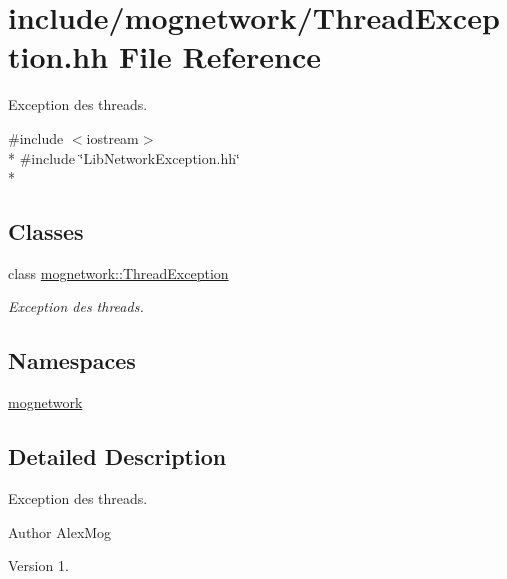 \hypertarget{_thread_exception_8hh}{\section{include/mognetwork/\-Thread\-Exception.hh File Reference}
\label{_thread_exception_8hh}
}


Exception des threads.  


{\ttfamily \#include $<$iostream$>$}\\*
{\ttfamily \#include \char`\"{}Lib\-Network\-Exception.\-hh\char`\"{}}\\*
\subsection*{Classes}
\begin{DoxyCompactItemize}
\item 
class \hyperlink{classmognetwork_1_1_thread_exception}{mognetwork\-::\-Thread\-Exception}
\begin{DoxyCompactList}\small\item\em Exception des threads. \end{DoxyCompactList}\end{DoxyCompactItemize}
\subsection*{Namespaces}
\begin{DoxyCompactItemize}
\item 
\hyperlink{namespacemognetwork}{mognetwork}
\end{DoxyCompactItemize}


\subsection{Detailed Description}
Exception des threads. \begin{DoxyAuthor}{Author}
Alex\-Mog 
\end{DoxyAuthor}
\begin{DoxyVersion}{Version}
1. 
\end{DoxyVersion}
